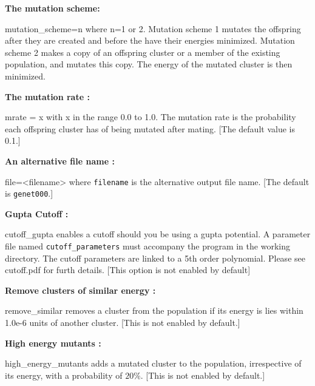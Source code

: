 \documentclass[12pt,a4paper]{article}
\newenvironment{entry}[1]
{\begin{list}{}{\renewcommand{\makelabel}[1]{~~\texttt{##1 :}\hfil}
      \setlength{\labelwidth}{90pt}
      \setlength{\leftmargin}{\labelwidth+\labelsep}}}
{\end{list}}
\begin{document}
\noindent \textbf{The mutation scheme:}
\begin{entry}{a}
\item[mutation\_scheme=n] where n=1 or 2. Mutation scheme 1 mutates the offspring after they are created and before the have their energies minimized. Mutation scheme 2 makes a copy of an offspring cluster or a member of the existing population, and mutates this copy. The energy of the mutated cluster is then minimized.
\end{entry}

\noindent \textbf{The mutation rate :}
\begin{entry}{a}
\item[mrate = x] with x in the range 0.0 to 1.0. The mutation rate is the probability each offspring cluster has of being mutated after mating. [The default value is 0.1.]
\end{entry}

\noindent \textbf{An alternative file name :}
\begin{entry}{a}
\item[file=<filename>] where \texttt{filename} is the alternative output file name. [The default is \texttt{genet000}.]
\end{entry} 

\noindent \textbf{Gupta Cutoff :}
\begin{entry}{a}
\item[cutoff\_gupta] enables a cutoff should you be using a gupta potential. A parameter file named \texttt{cutoff\_parameters} must accompany the program in the working directory. The cutoff parameters are linked to a 5th order polynomial. Please see cutoff.pdf for furth details. [This option is not enabled by default] 
\end{entry}

\noindent \textbf{Remove clusters of similar energy :}
\begin{entry}{a} 
\item[remove\_similar] removes a cluster from the population if its energy is lies within 1.0e-6 units of another cluster. [This is not enabled by default.]
\end{entry}

\noindent \textbf{High energy mutants :}
\begin{entry}{a}
\item[high\_energy\_mutants] adds a mutated cluster to the population, irrespective of its energy, with a probability of $20\%$. [This is not enabled by default.]
\end{entry}
\end{document}
